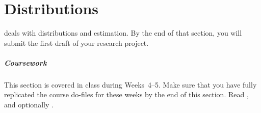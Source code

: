 %
%
\chapter{Distributions}%
	\label{ch:distr}%
  \begin{mybox}
     deals with distributions and estimation. By the end of that section, you will submit the first draft of your research project.%
    \paragraph{Coursework} %
    This section is covered in class during Weeks~4--5. Make sure that you have fully replicated the course do-files for these weeks by the end of this section. Read  \citeauthor[ch.~4--7]{Urdan:2010a}, and optionally \citeauthor[ch.~2.5--2.6 and 5]{FeinsteinThomas:2002d}.%
  \end{mybox}\\[4em]%
  \startcontents[chapters]%
	\newpage

%
%
%
%
%
%


\stopcontents[chapters]

%
%
